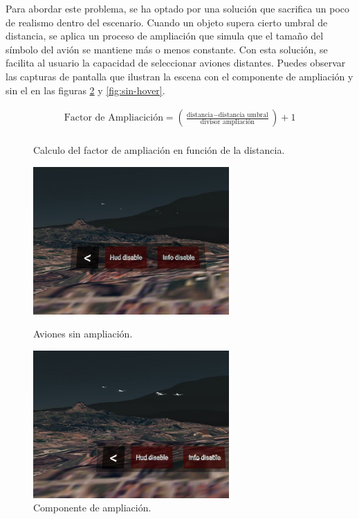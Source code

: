 \documentclass[a4paper, 11pt]{book}
\begin{document}
Para abordar este problema, se ha optado por una solución que sacrifica un poco de realismo dentro del escenario. Cuando un objeto supera cierto umbral de distancia, se aplica un proceso de ampliación que simula que el tamaño del símbolo del avión se mantiene más o menos constante. Con esta solución, se facilita al usuario la capacidad de seleccionar aviones distantes. Puedes observar las capturas de pantalla que ilustran la escena con el componente de ampliación y sin el en las figuras \ref{fig:con-hover} y \ref{fig:sin-hover}.
\begin{figure}[h]
	\begin{align*}
		\text{{Factor de Ampliacición}} = \left(\frac{{\text{{distancia}} - \text{{distancia umbral}}}}{{\text{{divisor ampliación}}}}\right) + 1\\
	\end{align*}
	\caption{Calculo del factor de ampliación en función de la distancia.}
	\label{formula:ampliación}
\end{figure}
\begin{figure}[h]
  \begin{minipage}[t]{0.5\linewidth}
    \centering
    \includegraphics[width=7.5cm, keepaspectratio]{img/sin_hover.jpg}
    \caption{Aviones sin ampliación.}
    \label{fig:sin-hover}
  \end{minipage}%
  \begin{minipage}[t]{0.5\linewidth}
    \centering
    \includegraphics[width=7.5cm, keepaspectratio]{img/con_hover.jpg}
    \caption{Componente de ampliación.}
    \label{fig:con-hover}    
  \end{minipage}
\end{figure}
\end{document}
